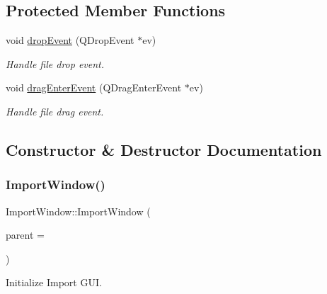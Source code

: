 \subsection*{Protected Member Functions}
\begin{DoxyCompactItemize}
\item 
void \hyperlink{class_import_window_af10cc2faf3a23226557d3e03d313bb53}{drop\+Event} (Q\+Drop\+Event $\ast$ev)
\begin{DoxyCompactList}\small\item\em Handle file drop event. \end{DoxyCompactList}\item 
void \hyperlink{class_import_window_a6b4d71b27e93f2e9f635665cd9d6e63f}{drag\+Enter\+Event} (Q\+Drag\+Enter\+Event $\ast$ev)
\begin{DoxyCompactList}\small\item\em Handle file drag event. \end{DoxyCompactList}\end{DoxyCompactItemize}


\subsection{Constructor \& Destructor Documentation}
\mbox{\label{class_import_window_afe9636b4ecf8c7c7b01439cbd77242be}} 
\subsubsection{\texorpdfstring{Import\+Window()}{ImportWindow()}}
{\footnotesize\ttfamily Import\+Window\+::\+Import\+Window (\begin{DoxyParamCaption}\item[{Q\+Widget $\ast$}]{parent = {} }\end{DoxyParamCaption})\hspace{0.3cm}{\ttfamily [explicit]}}



Initialize Import G\+UI. 


